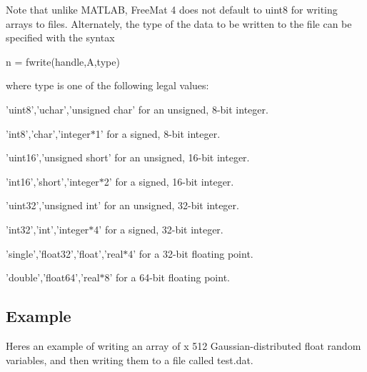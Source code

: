 Note that unlike M\-A\-T\-L\-A\-B, Free\-Mat 4 does not default to {\ttfamily uint8} for writing arrays to files. Alternately, the type of the data to be written to the file can be specified with the syntax \begin{DoxyVerb}  n = fwrite(handle,A,type)
\end{DoxyVerb}
 where {\ttfamily type} is one of the following legal values\-: 
\begin{DoxyItemize}
\item 'uint8','uchar','unsigned char' for an unsigned, 8-\/bit integer.  
\item 'int8','char','integer$\ast$1' for a signed, 8-\/bit integer.  
\item 'uint16','unsigned short' for an unsigned, 16-\/bit integer.  
\item 'int16','short','integer$\ast$2' for a signed, 16-\/bit integer.  
\item 'uint32','unsigned int' for an unsigned, 32-\/bit integer.  
\item 'int32','int','integer$\ast$4' for a signed, 32-\/bit integer.  
\item 'single','float32','float','real$\ast$4' for a 32-\/bit floating point.  
\item 'double','float64','real$\ast$8' for a 64-\/bit floating point.  
\end{DoxyItemize}\hypertarget{variables_struct_Example}{}\subsection{Example}\label{variables_struct_Example}
Heres an example of writing an array of { x 512} Gaussian-\/distributed {\ttfamily float} random variables, and then writing them to a file called {\ttfamily test.\-dat}.


